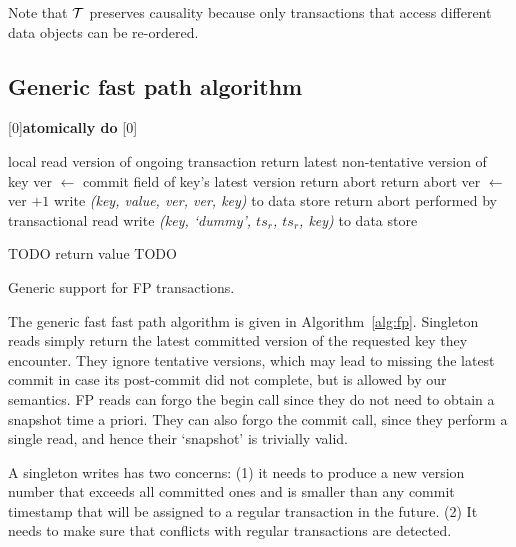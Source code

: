 Note that  ${\cal T}$  preserves causality because 
only transactions that  access different data objects can be re-ordered.


\subsection{Generic fast path algorithm}
\label{ssec:fast-algorithm}



\begin{algorithm}[htb]
[0]{{\bf atomically do}}
[0]{}
\begin{algorithmic}
\State local   \Comment  read version of ongoing transaction
\Statex
{}
\State
return latest non-tentative version of key
\EndProcedure
%
\Statex
{} 
	\State ver $\leftarrow$ commit field of key's latest version
	 return abort \EndIf
	 return abort \EndIf
	ver $\leftarrow$ ver $+1$ 
\Atomic 
	\State	write \emph{(key, value, ver, ver, key)} to data store 
	\Else \State return abort \EndIf
\EndAtomic
\EndProcedure
{} 
\Statex \Comment performed by transactional read
	\State	write \emph{(key, `dummy', $ts_r$, $ts_r$, key)} to data store 
\EndProcedure

\Statex
{} 
\State TODO %
\State  return value
\EndProcedure
{} 
\State TODO
\EndProcedure

\end{algorithmic}
\caption{Generic support for FP transactions.}
\label{alg:fp}
\end{algorithm}

The generic fast fast path algorithm is given in Algorithm~\ref{alg:fp}. 
%
Singleton reads simply return the latest committed version of the requested key they encounter.  
They ignore tentative versions, which may lead to missing the latest commit in case its post-commit did not complete, 
but is allowed by our semantics. 
FP reads can forgo the begin call since they do not need to obtain a snapshot time a priori. 
They can also forgo the commit call, since they perform a single read, and hence their `snapshot' is trivially valid.
 
A singleton writes has two concerns: (1) it needs to  produce a new version number that exceeds all committed ones and
is smaller than any commit timestamp that will be assigned to a regular transaction in the future.
(2)  It needs to make sure that conflicts with regular transactions are detected. 

